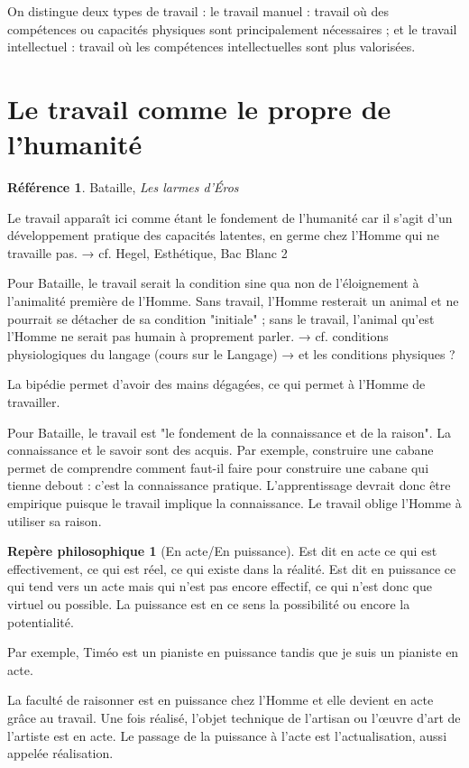 \documentclass[french]{book}
\theoremstyle{definition}
\newtheorem*{refe}{Référence}
\newtheorem*{rep}{Repère philosophique}
\begin{document}
On distingue deux types de travail :
le travail manuel : travail où des compétences ou capacités physiques sont principalement nécessaires ;
et le travail intellectuel : travail où les compétences intellectuelles sont plus valorisées.

\section{Le travail comme le propre de l'humanité}

\begin{refe}
	Bataille, \textit{Les larmes d'Éros}
\end{refe}

Le travail apparaît ici comme étant le fondement de l'humanité car il s'agit d'un développement pratique des capacités latentes, en germe chez l'Homme qui ne travaille pas.
→ cf. Hegel, Esthétique, Bac Blanc 2

Pour Bataille, le travail serait la condition sine qua non de l'éloignement à l'animalité première de l'Homme. Sans travail, l'Homme resterait un animal et ne pourrait se détacher de sa condition "initiale" ; sans le travail, l'animal qu'est l'Homme ne serait pas humain à proprement parler.
→ cf. conditions physiologiques du langage (cours sur le Langage)
→ et les conditions physiques ?

La bipédie permet d'avoir des mains dégagées, ce qui permet à l'Homme de travailler.

Pour Bataille, le travail est "le fondement de la connaissance et de la raison".
La connaissance et le savoir sont des acquis. Par exemple, construire une cabane permet de comprendre comment faut-il faire pour construire une cabane qui tienne debout : c'est la connaissance pratique. L'apprentissage devrait donc être empirique puisque le travail implique la connaissance.
Le travail oblige l'Homme à utiliser sa raison.

\begin{rep}[En acte/En puissance]
Est dit en acte ce qui est effectivement, ce qui est réel, ce qui existe dans la réalité.
Est dit en puissance ce qui tend vers un acte mais qui n'est pas encore effectif, ce qui n'est donc que virtuel ou possible. La puissance est en ce sens la possibilité ou encore la potentialité.
\end{rep}

Par exemple, Timéo est un pianiste en puissance tandis que je suis un pianiste en acte.

La faculté de raisonner est en puissance chez l'Homme et elle devient en acte grâce au travail.
Une fois réalisé, l'objet technique de l'artisan ou l'œuvre d'art de l'artiste est en acte.
Le passage de la puissance à l'acte est l'actualisation, aussi appelée réalisation.
\end{document}
